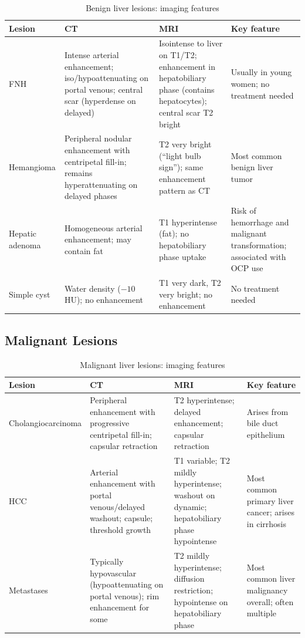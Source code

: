 \begin{table}[h]
\centering
\caption{Benign liver lesions: imaging features}
\begin{tabular}{p{2.5cm} p{3.5cm} p{3.5cm} p{3cm}}
\hline
\textbf{Lesion} & \textbf{CT} & \textbf{MRI} & \textbf{Key feature} \\
\hline
FNH & Intense arterial enhancement; iso/hypoattenuating on portal venous; central scar (hyperdense on delayed) & Isointense to liver on T1/T2; enhancement in hepatobiliary phase (contains hepatocytes); central scar T2 bright & Usually in young women; no treatment needed \\
Hemangioma & Peripheral nodular enhancement with centripetal fill-in; remains hyperattenuating on delayed phases & T2 very bright (``light bulb sign''); same enhancement pattern as CT & Most common benign liver tumor \\
Hepatic adenoma & Homogeneous arterial enhancement; may contain fat & T1 hyperintense (fat); no hepatobiliary phase uptake & Risk of hemorrhage and malignant transformation; associated with OCP use \\
Simple cyst & Water density ($-10$ HU); no enhancement & T1 very dark, T2 very bright; no enhancement & No treatment needed \\
\hline
\end{tabular}
\end{table}

\subsection{Malignant Lesions}

\begin{table}[h]
\centering
\caption{Malignant liver lesions: imaging features}
\begin{tabular}{p{2.5cm} p{3.5cm} p{3.5cm} p{3cm}}
\hline
\textbf{Lesion} & \textbf{CT} & \textbf{MRI} & \textbf{Key feature} \\
\hline
Cholangiocarcinoma & Peripheral enhancement with progressive centripetal fill-in; capsular retraction & T2 hyperintense; delayed enhancement; capsular retraction & Arises from bile duct epithelium \\
HCC & Arterial enhancement with portal venous/delayed washout; capsule; threshold growth & T1 variable; T2 mildly hyperintense; washout on dynamic; hepatobiliary phase hypointense & Most common primary liver cancer; arises in cirrhosis \\
Metastases & Typically hypovascular (hypoattenuating on portal venous); rim enhancement for some & T2 mildly hyperintense; diffusion restriction; hypointense on hepatobiliary phase & Most common liver malignancy overall; often multiple \\
\hline
\end{tabular}
\end{table}


